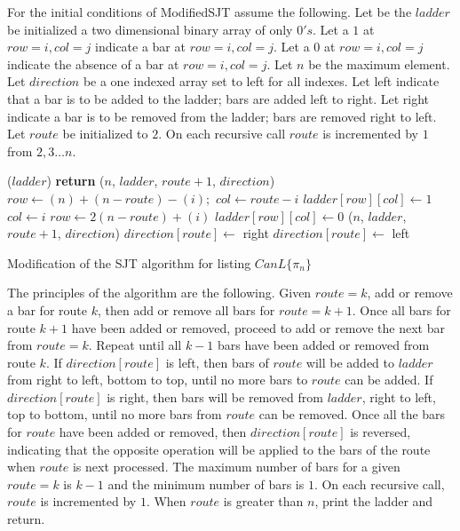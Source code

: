 For the initial conditions of {\sc ModifiedSJT} assume the following. 
Let be the $ladder$ be initialized a two dimensional binary array of only $0's$.
 Let a $1$ at $row=i,col=j$ 
indicate a bar at  $row=i,col=j$. Let a $0$ at $row=i,col=j$ 
indicate the absence of a bar at  $row=i,col=j$.
Let $n$ be the maximum element. Let $direction$ be a one 
indexed array set to left for all indexes. Let left indicate that a bar is to be added to the ladder; bars 
are added left to right. Let right indicate a bar is to be removed from the ladder; bars 
are removed right to left. Let $route$ be initialized to $2$. On each recursive call 
$route$ is incremented by $1$ from $2,3 \dots n$.
\begin{algorithm}
  \begin{algorithmic}[1]
        ($ladder$)
        \State \textbf{return}
      \EndIf
          ($n$, $ladder$, $route+1$, $direction$)
        \Else 
            \State $row \gets (n) + (n - route) - (i);$
            \State $col \gets route - i$
            \State $ladder[row][col] \gets 1$
          \Else
            \State $col \gets i$
            \State $row \gets 2(n - route) + (i)$
            \State $ladder[row][col] \gets 0$
          \EndIf
        \EndIf
        ($n$, $ladder$, $route+1$, $direction$)
      \EndFor
        \State $direction[route] \gets$ right
      \Else
        \State $direction[route] \gets$ left
      \EndIf
    \EndFunction
  \end{algorithmic}
  \caption{Modification of the {\sc SJT} algorithm for listing $CanL\{\pi_{n}\}$}
  \label{Alg:ModSJT}
\end{algorithm}


\pagebreak


The principles of the algorithm are the following. Given $route=k$, add or remove a bar for route $k$, then add or remove 
all bars for $route=k+1$. Once all bars for route $k+1$ have been added or removed, 
proceed to add or remove the next bar from $route=k$. Repeat until all $k-1$ bars have been added or removed from route $k$.
If $direction[route]$ is left, then bars of $route$ will be added to 
$ladder$ from right to left, bottom to top, until no more bars to $route$ can be added.
If $direction[route]$ is right, then bars will be removed from $ladder$, right to left, top to bottom, until 
no more bars from $route$ can be removed. Once all the bars for $route$ have 
been added or removed, then $direction[route]$ is reversed,
indicating that the opposite operation will be applied to the bars of the route when 
$route$ is next processed. The maximum number of bars for a given $route=k$ is $k-1$ and the minimum number of 
bars is $1$. On each recursive call, $route$ is 
incremented by $1$. When $route$ is greater than $n$, print the ladder 
and return. 


